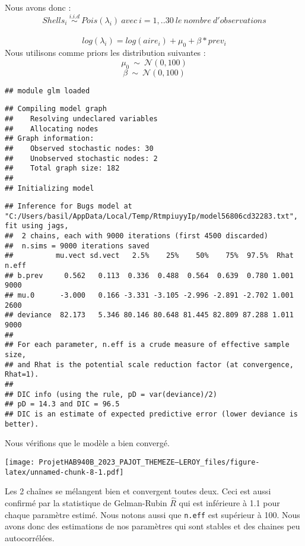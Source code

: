 \documentclass[
]{article}
\begin{document}
Nous avons donc :
\[Shells_i\:\stackrel{i.i.d}{\sim} \: Pois(\lambda_i)\:avec\:i=1,..30\:le\:nombre\:d'observations\]\\
\[log(\lambda_i) =  log({aire_{i}}) + \mu_0 + \beta * prev_i\] \newline 
Nous utilisons comme priors les distribution suivantes : \newline 
\[\mu_0\:{\sim}\:\mathcal{N}(0, 100)\]
\[\beta\:{\sim}\:\mathcal{N}(0, 100)\]

\begin{verbatim}
## module glm loaded
\end{verbatim}

\begin{verbatim}
## Compiling model graph
##    Resolving undeclared variables
##    Allocating nodes
## Graph information:
##    Observed stochastic nodes: 30
##    Unobserved stochastic nodes: 2
##    Total graph size: 182
## 
## Initializing model
\end{verbatim}

\begin{verbatim}
## Inference for Bugs model at "C:/Users/basil/AppData/Local/Temp/RtmpiuyyIp/model56806cd32283.txt", fit using jags,
##  2 chains, each with 9000 iterations (first 4500 discarded)
##  n.sims = 9000 iterations saved
##          mu.vect sd.vect   2.5%    25%    50%    75%  97.5%  Rhat n.eff
## b.prev     0.562   0.113  0.336  0.488  0.564  0.639  0.780 1.001  9000
## mu.0      -3.000   0.166 -3.331 -3.105 -2.996 -2.891 -2.702 1.001  2600
## deviance  82.173   5.346 80.146 80.648 81.445 82.809 87.288 1.011  9000
## 
## For each parameter, n.eff is a crude measure of effective sample size,
## and Rhat is the potential scale reduction factor (at convergence, Rhat=1).
## 
## DIC info (using the rule, pD = var(deviance)/2)
## pD = 14.3 and DIC = 96.5
## DIC is an estimate of expected predictive error (lower deviance is better).
\end{verbatim}

Nous vérifions que le modèle a bien convergé.

\texttt{[image: ProjetHAB940B\_2023\_PAJOT\_THEMEZE--LEROY\_files/figure-latex/unnamed-chunk-8-1.pdf]}

Les 2 chaînes se mélangent bien et convergent toutes deux. Ceci est
aussi confirmé par la statistique de Gelman-Rubin \(\hat{R}\) qui est
inférieure à 1.1 pour chaque paramètre estimé. Nous notons aussi que
\texttt{n.eff} est supérieur à 100. Nous avons donc des estimations de
nos paramètres qui sont stables et des chaines peu autocorrélées.
\end{document}
